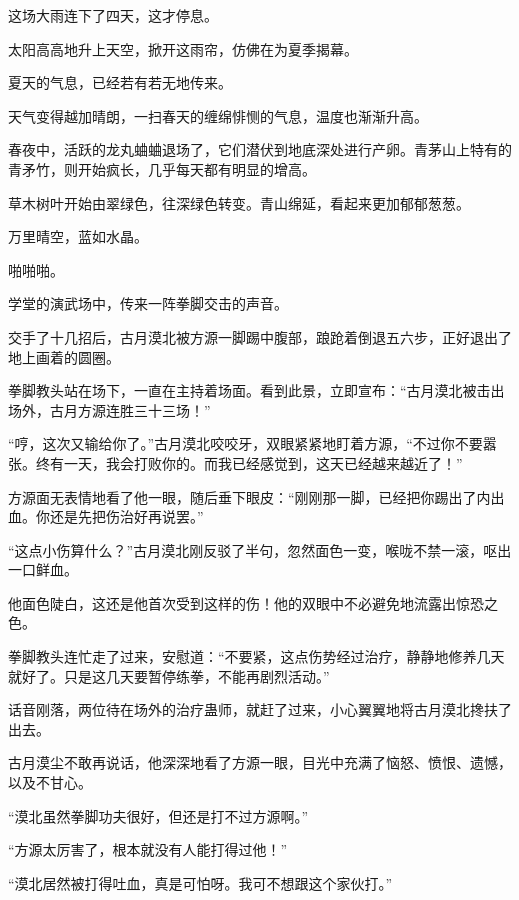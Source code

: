
\begin{this_body}



这场大雨连下了四天，这才停息。

太阳高高地升上天空，掀开这雨帘，仿佛在为夏季揭幕。

夏天的气息，已经若有若无地传来。

天气变得越加晴朗，一扫春天的缠绵悱恻的气息，温度也渐渐升高。

春夜中，活跃的龙丸蛐蛐退场了，它们潜伏到地底深处进行产卵。青茅山上特有的青矛竹，则开始疯长，几乎每天都有明显的增高。

草木树叶开始由翠绿色，往深绿色转变。青山绵延，看起来更加郁郁葱葱。

万里晴空，蓝如水晶。

啪啪啪。

学堂的演武场中，传来一阵拳脚交击的声音。

交手了十几招后，古月漠北被方源一脚踢中腹部，踉跄着倒退五六步，正好退出了地上画着的圆圈。

拳脚教头站在场下，一直在主持着场面。看到此景，立即宣布：“古月漠北被击出场外，古月方源连胜三十三场！”

“哼，这次又输给你了。”古月漠北咬咬牙，双眼紧紧地盯着方源，“不过你不要嚣张。终有一天，我会打败你的。而我已经感觉到，这天已经越来越近了！”

方源面无表情地看了他一眼，随后垂下眼皮：“刚刚那一脚，已经把你踢出了内出血。你还是先把伤治好再说罢。”

“这点小伤算什么？”古月漠北刚反驳了半句，忽然面色一变，喉咙不禁一滚，呕出一口鲜血。

他面色陡白，这还是他首次受到这样的伤！他的双眼中不必避免地流露出惊恐之色。

拳脚教头连忙走了过来，安慰道：“不要紧，这点伤势经过治疗，静静地修养几天就好了。只是这几天要暂停练拳，不能再剧烈活动。”

话音刚落，两位待在场外的治疗蛊师，就赶了过来，小心翼翼地将古月漠北搀扶了出去。

古月漠尘不敢再说话，他深深地看了方源一眼，目光中充满了恼怒、愤恨、遗憾，以及不甘心。

“漠北虽然拳脚功夫很好，但还是打不过方源啊。”

“方源太厉害了，根本就没有人能打得过他！”

“漠北居然被打得吐血，真是可怕呀。我可不想跟这个家伙打。”


\end{this_body}
